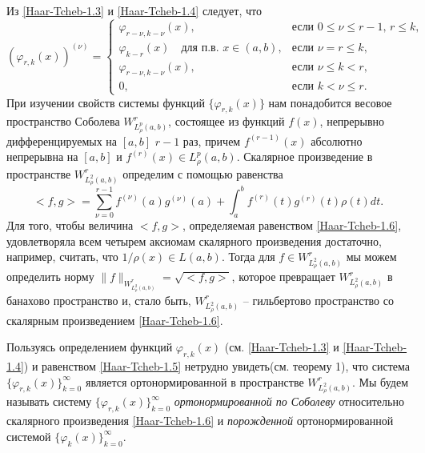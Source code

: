  Из \eqref{Haar-Tcheb-1.3} и \eqref{Haar-Tcheb-1.4} следует, что
 \begin{equation}\label{Haar-Tcheb-1.5}
(\varphi_{r,k}(x))^{(\nu)} =\begin{cases}\varphi_{r-\nu,k-\nu}(x),&\text{если $0\le\nu\le r-1$, $r\le k$,}\\
\varphi_{k-r}(x)\quad\text{для п.в. $x\in (a,b)$},&\text{если  $\nu=r\le k$,}\\
\varphi_{r-\nu,k-\nu}(x),&\text{если $\nu\le k< r$,}\\
0,&\text{если $k< \nu\le r$}.
  \end{cases}
\end{equation}
При изучении свойств системы функций $\{\varphi_{r,k}(x)\}$ нам понадобится весовое пространство Соболева $W^r_{L^p_\rho(a,b)}$, состоящее из функций $f(x)$, непрерывно дифференцируемых на $[a,b]$ $r-1$ раз, причем $f^{(r-1)}(x)$ абсолютно непрерывна на $[a,b]$  и $f^{(r)}(x)\in L^p_\rho(a,b)$.
Скалярное произведение в пространстве $W^r_{L^2_\rho(a,b)}$ определим с помощью равенства
\begin{equation}\label{Haar-Tcheb-1.6}
<f,g>=\sum_{\nu=0}^{r-1}f^{(\nu)}(a)g^{(\nu)}(a)+\int_{a}^{b} f^{(r)}(t)g^{(r)}(t)\rho(t) dt.
\end{equation}
Для того, чтобы величина $<f,g>$, определяемая равенством \eqref{Haar-Tcheb-1.6}, удовлетворяла всем четырем аксиомам скалярного произведения достаточно, например, считать, что $1/\rho(x)\in L(a,b)$.  Тогда для $f\in W^r_{L^2_\rho(a,b)}$ мы можем определить норму $\|f\|_{W^r_{L^2_\rho(a,b)}}=\sqrt{<f,g>}$, которое превращает $W^r_{L^2_\rho(a,b)}$ в банахово пространство и, стало быть, $W^r_{L^2_\rho(a,b)}$ -- гильбертово пространство со скалярным произведением \eqref{Haar-Tcheb-1.6}.

 Пользуясь определением функций  $\varphi_{r,k}(x)$ (см. \eqref{Haar-Tcheb-1.3} и \eqref{Haar-Tcheb-1.4}) и равенством  \eqref{Haar-Tcheb-1.5} нетрудно увидеть(см. теорему 1),  что система $\{\varphi_{r,k}(x)\}_{k=0}^\infty$ является ортонормированной в пространстве $W^r_{L^2_\rho(a,b)}$.  Мы будем называть систему $\{\varphi_{r,k}(x)\}_{k=0}^\infty$ \textit{ортонормированной по Соболеву } относительно скалярного произведения \eqref{Haar-Tcheb-1.6} и  \textit{порожденной} ортонормированной системой $\{\varphi_{k}(x)\}_{k=0}^\infty$.

